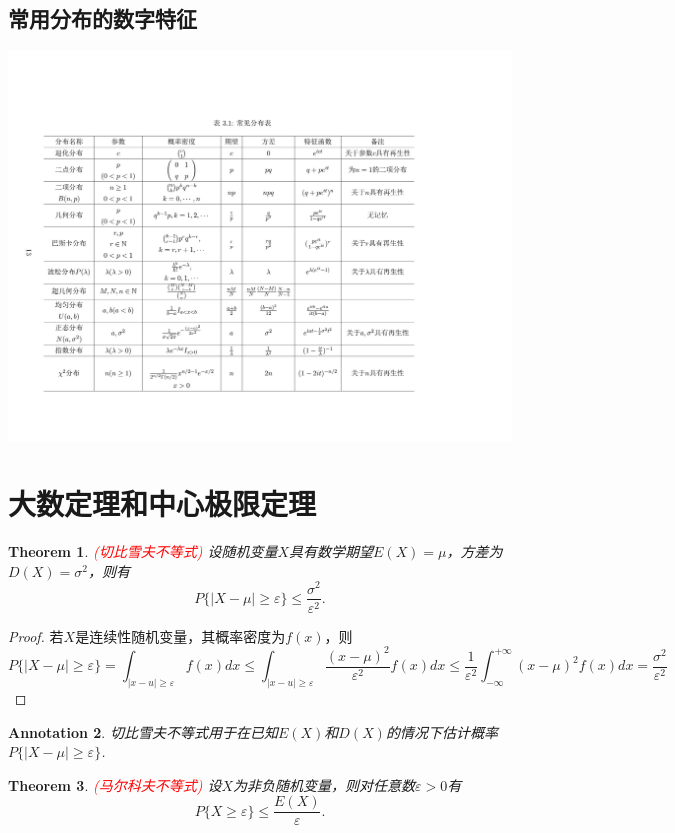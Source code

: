 \documentclass{article}
\newtheorem{theorem}{Theorem}[section]
\newtheorem{annotation}[theorem]{Annotation}
\newcommand{\redt}[1]{\textcolor{red}{#1}}
\begin{document}
\subsection{常用分布的数字特征}
\includegraphics[scale=0.2]{images/regular_distribution_characterize.jpg}

\section{大数定理和中心极限定理}

\begin{theorem}
\rm \redt{(切比雪夫不等式)} 设随机变量$X$具有数学期望$E(X)=\mu$，方差为$D(X) = \sigma^2$，则有
$$
P\{|X-\mu| \geq \varepsilon \} \leq \frac{\sigma^2}{\varepsilon^2}. 
$$
\end{theorem}

\begin{proof}
若$X$是连续性随机变量，其概率密度为$f(x)$，则
$$
P\{|X-\mu| \geq \varepsilon \} = \int_{|x-u| \geq \varepsilon} f(x)dx \leq \int_{|x-u| \geq \varepsilon} \frac{(x-\mu)^2}{\varepsilon^2}f(x)dx \leq \frac{1}{\varepsilon^2}\int_{-\infty}^{+\infty}(x-\mu)^2f(x)dx =\frac{\sigma^2}{\varepsilon^2}
$$
\end{proof}

\begin{annotation}
\rm 切比雪夫不等式用于在已知$E(X)$和$D(X)$的情况下估计概率$P\{|X-\mu|\geq \varepsilon\}$. 
\end{annotation}

\begin{theorem}
\rm \redt{(马尔科夫不等式)} 设$X$为非负随机变量，则对任意数$\varepsilon > 0$有
$$
P\{X \geq \varepsilon\} \leq \frac{E(X)}{\varepsilon}.
$$
\end{theorem}
\end{document}
